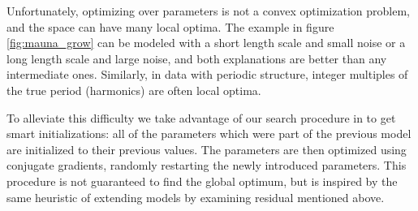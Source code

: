 \documentclass[twoside]{article}
\begin{document}
Unfortunately, optimizing over parameters is not a convex optimization problem, and the space can have many local optima.
The example in figure \ref{fig:mauna_grow} can be modeled with a short length scale and small noise or a long length scale and large noise, and both explanations are better than any intermediate ones.
Similarly, in data with periodic structure, integer multiples of the true period (\ie harmonics) are often local optima. 

To alleviate this difficulty we take advantage of our search procedure in to get smart initializations: all of the parameters which were part of the previous model are initialized to their previous values.
The parameters are then optimized using conjugate gradients, randomly restarting the newly introduced parameters.
This procedure is not guaranteed to find the global optimum, but is inspired by the same heuristic of extending models by examining residual mentioned above.


\end{document}

